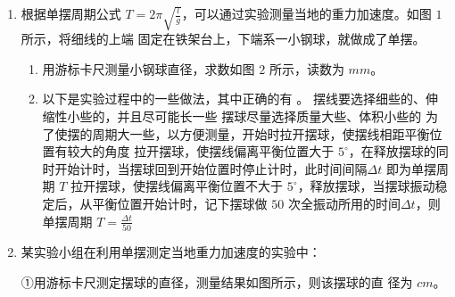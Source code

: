\begin{enumerate}
\renewcommand{\labelenumi}{\arabic{enumi}.}
\item
{}
根据单摆周期公式 $T=2 \pi \sqrt{\frac{l}{g}}$，可以通过实验测量当地的重力加速度。如图 $ 1 $ 所示，将细线的上端
固定在铁架台上，下端系一小钢球，就做成了单摆。
\begin{figure}[h!]
\centering

\end{figure}

\begin{enumerate}
\renewcommand{\labelenumi}{\arabic{enumi}.}
\item
用游标卡尺测量小钢球直径，求数如图 $ 2 $ 所示，读数为  $ mm $。


\item 
以下是实验过程中的一些做法，其中正确的有  。
\fivechoices
{摆线要选择细些的、伸缩性小些的，并且尽可能长一些}
{摆球尽量选择质量大些、体积小些的}
{为了使摆的周期大一些，以方便测量，开始时拉开摆球，使摆线相距平衡位置有较大的角度}
{拉开摆球，使摆线偏离平衡位置大于 $ 5 ^{ \circ } $，在释放摆球的同时开始计时，当摆球回到开始位置时停止计时，此时间间隔$ \Delta t $ 即为单摆周期 $ T $}
{拉开摆球，使摆线偏离平衡位置不大于 $ 5 ^{ \circ } $，释放摆球，当摆球振动稳定后，从平衡位置开始计时，记下摆球做 $ 50 $ 次全振动所用的时间$ \Delta t $，则单摆周期 $T=\frac{\Delta t}{50}$}


\end{enumerate}





\newpage
\item 
{}
某实验小组在利用单摆测定当地重力加速度的实验中：

①用游标卡尺测定摆球的直径，测量结果如图所示，则该摆球的直
径为
$ cm $。
\begin{figure}[h!]
\centering

\end{figure}


\end{enumerate}
